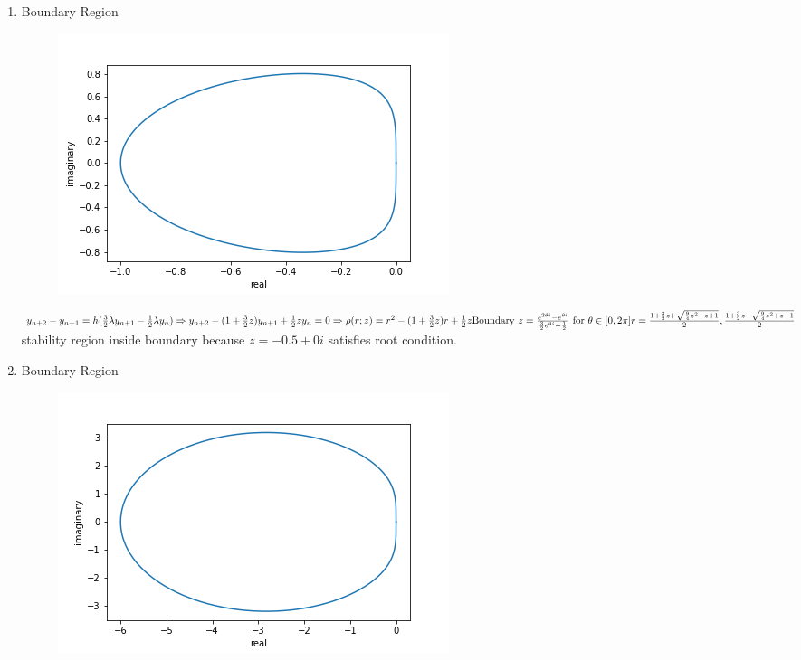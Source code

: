 \documentclass[10pt]{article}
\begin{document}
\begin{enumerate}[label=(\alph*)]
    \item Boundary Region
    \begin{figure}[H]
        \includegraphics[scale=0.5]{AB_2_boundary.png}
    \end{figure}
    $y_{n+2}-y_{n+1}=h(\frac{3}{2}\lambda y_{n+1}-\frac{1}{2}\lambda y_n)\\
    \Rightarrow y_{n+2}-(1+\frac{3}{2}z)y_{n+1}+\frac{1}{2}z y_n=0\\
    \Rightarrow \rho(r;z)=r^2-(1+\frac{3}{2}z)r+\frac{1}{2}z\\
    \text{Boundary }z=\frac{e^{2\theta i}-e^{\theta i}}{\frac{3}{2}e^{\theta i}-\frac{1}{2}}\text{ for }\theta\in[0,2\pi]\\
    r=\frac{1+\frac{3}{2}z+\sqrt{\frac{9}{4}z^2+z+1}}{2},\frac{1+\frac{3}{2}z-\sqrt{\frac{9}{4}z^2+z+1}}{2}$\\
    stability region inside boundary because $z=-0.5+0i$ satisfies root condition.\\
    \pagebreak
    \item Boundary Region
    \begin{figure}[H]
        \includegraphics[scale=0.5]{AM_2_boundary.png}

\end{figure}
\end{enumerate}
\end{document}
